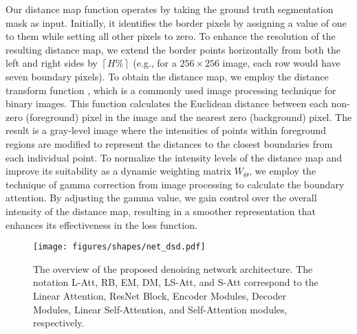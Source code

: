 \documentclass[runningheads]{llncs}
\begin{document}
Our distance map function operates by taking the ground truth segmentation mask as input. Initially, it identifies the border pixels by assigning a value of one to them while setting all other pixels to zero. To enhance the resolution of the resulting distance map, we extend the border points horizontally from both the left and right sides by $\left\lceil H\% \right\rceil$ (e.g., for a $256\times256$ image, each row would have seven boundary pixels). To obtain the distance map, we employ the distance transform function \cite{kimmel1996sub}, which is a commonly used image processing technique for binary images. This function calculates the Euclidean distance between each non-zero (foreground) pixel in the image and the nearest zero (background) pixel. The result is a gray-level image where the intensities of points within foreground regions are modified to represent the distances to the closest boundaries from each individual point. To normalize the intensity levels of the distance map and improve its suitability as a dynamic weighting matrix $W_{\Theta}$, we employ the technique of gamma correction from image processing to calculate the boundary attention. By adjusting the gamma value, we gain control over the overall intensity of the distance map, resulting in a smoother representation that enhances its effectiveness in the loss function.

\begin{figure}[!t]
    
    \centering
    \texttt{[image: figures/shapes/net\_dsd.pdf]}
    \caption{The overview of the proposed denoising network architecture. The notation L-Att, RB, EM, DM, LS-Att, and S-Att correspond to the Linear Attention, ResNet Block, Encoder Modules, Decoder Modules, Linear Self-Attention, and Self-Attention modules, respectively.}
    
    \label{fig:network}
\end{figure}
\end{document}
